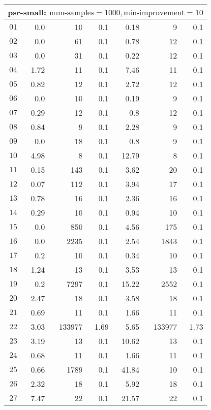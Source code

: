 \begin{longtable}{|c||r|r|r||r|r|r|}
\multicolumn{7}{|l|}{psr-small: $\text{num-samples}=1000,\text{min-improvement}=10$}\\\hline
$01$ & 0.0 & 10 & 0.1 &0.18 & 9 & 0.1 \\\hline
$02$ & 0.0 & 61 & 0.1 &0.78 & 12 & 0.1 \\\hline
$03$ & 0.0 & 31 & 0.1 &0.22 & 12 & 0.1 \\\hline
$04$ & 1.72 & 11 & 0.1 &7.46 & 11 & 0.1 \\\hline
$05$ & 0.82 & 12 & 0.1 &2.72 & 12 & 0.1 \\\hline
$06$ & 0.0 & 10 & 0.1 &0.19 & 9 & 0.1 \\\hline
$07$ & 0.29 & 12 & 0.1 &0.8 & 12 & 0.1 \\\hline
$08$ & 0.84 & 9 & 0.1 &2.28 & 9 & 0.1 \\\hline
$09$ & 0.0 & 18 & 0.1 &0.8 & 9 & 0.1 \\\hline
$10$ & 4.98 & 8 & 0.1 &12.79 & 8 & 0.1 \\\hline
$11$ & 0.15 & 143 & 0.1 &3.62 & 20 & 0.1 \\\hline
$12$ & 0.07 & 112 & 0.1 &3.94 & 17 & 0.1 \\\hline
$13$ & 0.78 & 16 & 0.1 &2.36 & 16 & 0.1 \\\hline
$14$ & 0.29 & 10 & 0.1 &0.94 & 10 & 0.1 \\\hline
$15$ & 0.0 & 850 & 0.1 &4.56 & 175 & 0.1 \\\hline
$16$ & 0.0 & 2235 & 0.1 &2.54 & 1843 & 0.1 \\\hline
$17$ & 0.2 & 10 & 0.1 &0.34 & 10 & 0.1 \\\hline
$18$ & 1.24 & 13 & 0.1 &3.53 & 13 & 0.1 \\\hline
$19$ & 0.2 & 7297 & 0.1 &15.22 & 2552 & 0.1 \\\hline
$20$ & 2.47 & 18 & 0.1 &3.58 & 18 & 0.1 \\\hline
$21$ & 0.69 & 11 & 0.1 &1.66 & 11 & 0.1 \\\hline
$22$ & 3.03 & 133977 & 1.69 &5.65 & 133977 & 1.73 \\\hline
$23$ & 3.19 & 13 & 0.1 &10.62 & 13 & 0.1 \\\hline
$24$ & 0.68 & 11 & 0.1 &1.66 & 11 & 0.1 \\\hline
$25$ & 0.66 & 1789 & 0.1 &41.84 & 10 & 0.1 \\\hline
$26$ & 2.32 & 18 & 0.1 &5.92 & 18 & 0.1 \\\hline
$27$ & 7.47 & 22 & 0.1 &21.57 & 22 & 0.1 \\\hline

\end{longtable}
